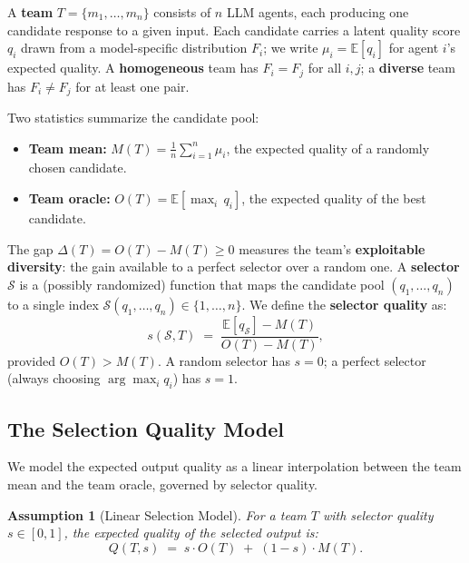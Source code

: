 \documentclass[10pt,twocolumn]{article}
\newtheorem{assumption}{Assumption}
\theoremstyle{remark}
\begin{document}
A \textbf{team} $T = \{m_1, \ldots, m_n\}$ consists of $n$ LLM agents, each producing one candidate response to a given input. Each candidate carries a latent quality score $q_i$ drawn from a model-specific distribution $F_i$; we write $\mu_i = \mathbb{E}[q_i]$ for agent $i$'s expected quality. A \textbf{homogeneous} team has $F_i = F_j$ for all $i, j$; a \textbf{diverse} team has $F_i \neq F_j$ for at least one pair.

Two statistics summarize the candidate pool:
\begin{itemize}[nosep]
  \item \textbf{Team mean:} $M(T) = \frac{1}{n} \sum_{i=1}^n \mu_i$, the expected quality of a randomly chosen candidate.
  \item \textbf{Team oracle:} $O(T) = \mathbb{E}[\max_i\, q_i]$, the expected quality of the best candidate.
\end{itemize}

The gap $\Delta(T) = O(T) - M(T) \geq 0$ measures the team's \textbf{exploitable diversity}: the gain available to a perfect selector over a random one. A \textbf{selector} $\mathcal{S}$ is a (possibly randomized) function that maps the candidate pool $(q_1, \ldots, q_n)$ to a single index $\mathcal{S}(q_1, \ldots, q_n) \in \{1, \ldots, n\}$. We define the \textbf{selector quality} as:
\begin{equation}
s(\mathcal{S}, T) \;=\; \frac{\mathbb{E}[q_{\mathcal{S}}] - M(T)}{O(T) - M(T)},
\label{eq:selector_quality}
\end{equation}
provided $O(T) > M(T)$. A random selector has $s = 0$; a perfect selector (always choosing $\arg\max_i q_i$) has $s = 1$.

\subsection{The Selection Quality Model}
\label{sec:sqm}

We model the expected output quality as a linear interpolation between the team mean and the team oracle, governed by selector quality.

\begin{assumption}[Linear Selection Model]
\label{ass:linear}
For a team $T$ with selector quality $s \in [0,1]$, the expected quality of the selected output is:
\begin{equation}
Q(T, s) \;=\; s \cdot O(T) \;+\; (1 - s) \cdot M(T).
\label{eq:quality}
\end{equation}
\end{assumption}
\end{document}
